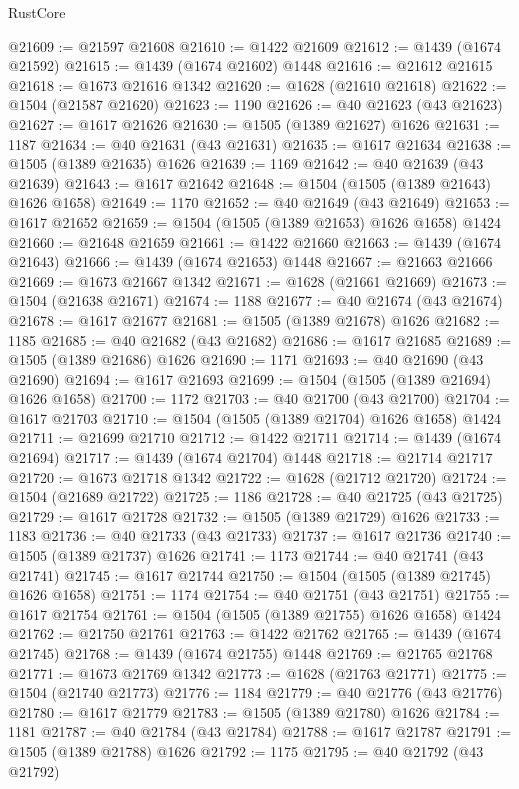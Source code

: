 \begin{lexlean}{RustCore}
\begin{coremodule}
@21609 := @21597 @21608
@21610 := @1422 @21609
@21612 := @1439 (@1674 @21592)
@21615 := @1439 (@1674 @21602) @1448
@21616 := @21612 @21615
@21618 := @1673 @21616 @1342
@21620 := @1628 (@21610 @21618)
@21622 := @1504 (@21587 @21620)
@21623 := 1190
@21626 := @40 @21623 (@43 @21623)
@21627 := @1617 @21626
@21630 := @1505 (@1389 @21627) @1626
@21631 := 1187
@21634 := @40 @21631 (@43 @21631)
@21635 := @1617 @21634
@21638 := @1505 (@1389 @21635) @1626
@21639 := 1169
@21642 := @40 @21639 (@43 @21639)
@21643 := @1617 @21642
@21648 := @1504 (@1505 (@1389 @21643) @1626 @1658)
@21649 := 1170
@21652 := @40 @21649 (@43 @21649)
@21653 := @1617 @21652
@21659 := @1504 (@1505 (@1389 @21653) @1626 @1658) @1424
@21660 := @21648 @21659
@21661 := @1422 @21660
@21663 := @1439 (@1674 @21643)
@21666 := @1439 (@1674 @21653) @1448
@21667 := @21663 @21666
@21669 := @1673 @21667 @1342
@21671 := @1628 (@21661 @21669)
@21673 := @1504 (@21638 @21671)
@21674 := 1188
@21677 := @40 @21674 (@43 @21674)
@21678 := @1617 @21677
@21681 := @1505 (@1389 @21678) @1626
@21682 := 1185
@21685 := @40 @21682 (@43 @21682)
@21686 := @1617 @21685
@21689 := @1505 (@1389 @21686) @1626
@21690 := 1171
@21693 := @40 @21690 (@43 @21690)
@21694 := @1617 @21693
@21699 := @1504 (@1505 (@1389 @21694) @1626 @1658)
@21700 := 1172
@21703 := @40 @21700 (@43 @21700)
@21704 := @1617 @21703
@21710 := @1504 (@1505 (@1389 @21704) @1626 @1658) @1424
@21711 := @21699 @21710
@21712 := @1422 @21711
@21714 := @1439 (@1674 @21694)
@21717 := @1439 (@1674 @21704) @1448
@21718 := @21714 @21717
@21720 := @1673 @21718 @1342
@21722 := @1628 (@21712 @21720)
@21724 := @1504 (@21689 @21722)
@21725 := 1186
@21728 := @40 @21725 (@43 @21725)
@21729 := @1617 @21728
@21732 := @1505 (@1389 @21729) @1626
@21733 := 1183
@21736 := @40 @21733 (@43 @21733)
@21737 := @1617 @21736
@21740 := @1505 (@1389 @21737) @1626
@21741 := 1173
@21744 := @40 @21741 (@43 @21741)
@21745 := @1617 @21744
@21750 := @1504 (@1505 (@1389 @21745) @1626 @1658)
@21751 := 1174
@21754 := @40 @21751 (@43 @21751)
@21755 := @1617 @21754
@21761 := @1504 (@1505 (@1389 @21755) @1626 @1658) @1424
@21762 := @21750 @21761
@21763 := @1422 @21762
@21765 := @1439 (@1674 @21745)
@21768 := @1439 (@1674 @21755) @1448
@21769 := @21765 @21768
@21771 := @1673 @21769 @1342
@21773 := @1628 (@21763 @21771)
@21775 := @1504 (@21740 @21773)
@21776 := 1184
@21779 := @40 @21776 (@43 @21776)
@21780 := @1617 @21779
@21783 := @1505 (@1389 @21780) @1626
@21784 := 1181
@21787 := @40 @21784 (@43 @21784)
@21788 := @1617 @21787
@21791 := @1505 (@1389 @21788) @1626
@21792 := 1175
@21795 := @40 @21792 (@43 @21792)

\end{coremodule}
\end{lexlean}
